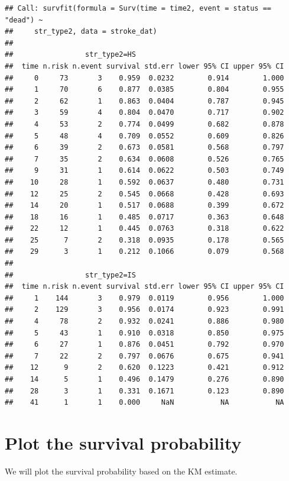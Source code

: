 \documentclass[
]{book}
\begin{document}
\begin{verbatim}
## Call: survfit(formula = Surv(time = time2, event = status == "dead") ~ 
##     str_type2, data = stroke_dat)
## 
##                 str_type2=HS 
##  time n.risk n.event survival std.err lower 95% CI upper 95% CI
##     0     73       3    0.959  0.0232        0.914        1.000
##     1     70       6    0.877  0.0385        0.804        0.955
##     2     62       1    0.863  0.0404        0.787        0.945
##     3     59       4    0.804  0.0470        0.717        0.902
##     4     53       2    0.774  0.0499        0.682        0.878
##     5     48       4    0.709  0.0552        0.609        0.826
##     6     39       2    0.673  0.0581        0.568        0.797
##     7     35       2    0.634  0.0608        0.526        0.765
##     9     31       1    0.614  0.0622        0.503        0.749
##    10     28       1    0.592  0.0637        0.480        0.731
##    12     25       2    0.545  0.0668        0.428        0.693
##    14     20       1    0.517  0.0688        0.399        0.672
##    18     16       1    0.485  0.0717        0.363        0.648
##    22     12       1    0.445  0.0763        0.318        0.622
##    25      7       2    0.318  0.0935        0.178        0.565
##    29      3       1    0.212  0.1066        0.079        0.568
## 
##                 str_type2=IS 
##  time n.risk n.event survival std.err lower 95% CI upper 95% CI
##     1    144       3    0.979  0.0119        0.956        1.000
##     2    129       3    0.956  0.0174        0.923        0.991
##     4     78       2    0.932  0.0241        0.886        0.980
##     5     43       1    0.910  0.0318        0.850        0.975
##     6     27       1    0.876  0.0451        0.792        0.970
##     7     22       2    0.797  0.0676        0.675        0.941
##    12      9       2    0.620  0.1223        0.421        0.912
##    14      5       1    0.496  0.1479        0.276        0.890
##    28      3       1    0.331  0.1671        0.123        0.890
##    41      1       1    0.000     NaN           NA           NA
\end{verbatim}

\hypertarget{plot-the-survival-probability}{%
\section{Plot the survival probability}\label{plot-the-survival-probability}}

We will plot the survival probability based on the KM estimate.
\end{document}
